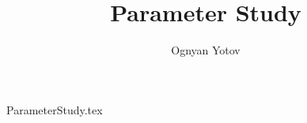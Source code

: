 \documentclass[10pt,a4paper]{article}
\title{Parameter Study }
\author{Ognyan Yotov}
\begin{document}
\maketitle

{ParameterStudy.tex}
\end{document}
